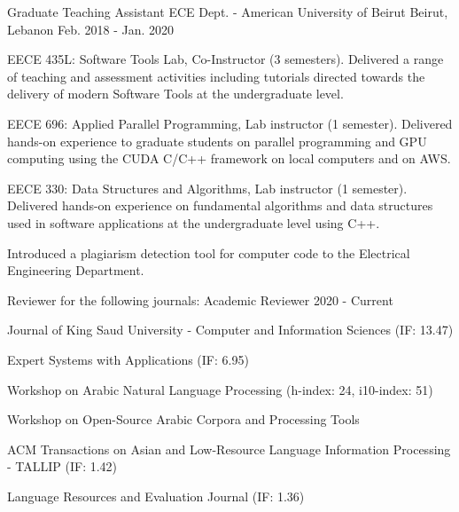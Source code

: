 \begin{cventries}
  \cventry
    {Graduate Teaching Assistant} %
    {ECE Dept. - American University of Beirut} %
    {Beirut, Lebanon} %
    {Feb. 2018 - Jan. 2020} %
    { 
      \begin{cvitems} %
        \item {EECE 435L: Software Tools Lab, Co-Instructor (3 semesters).  Delivered a range of teaching and assessment activities including tutorials directed towards the delivery of modern Software Tools at the undergraduate level.}
        \item {EECE 696: Applied Parallel Programming, Lab instructor (1 semester). Delivered hands-on experience to graduate students on parallel programming and GPU computing using the CUDA C/C++ framework on local computers and on AWS.}
        \item {EECE 330: Data Structures and Algorithms, Lab instructor (1 semester). Delivered hands-on experience on fundamental algorithms and data structures used in software applications at the undergraduate level using C++.}
        \item{Introduced a plagiarism detection tool for computer code to the Electrical Engineering Department.}
      \end{cvitems}
    }
  \cventry
    {Reviewer for the following journals:} %
    {Academic Reviewer} %
    {} %
    {2020 - Current} %
    { 
      \begin{cvitems} %
      \item {Journal of King Saud University - Computer and Information Sciences (IF: 13.47)}
        \item {Expert Systems with Applications (IF: 6.95)}
        \item Workshop on Arabic Natural Language Processing (h-index: 24, i10-index: 51)
        \item Workshop on Open-Source Arabic Corpora and Processing Tools
        \item {ACM Transactions on Asian and Low-Resource Language Information Processing - TALLIP (IF: 1.42)}
        \item {Language Resources and Evaluation Journal (IF: 1.36)}
      \end{cvitems}
    }
    \newline
    \newline

\end{cventries}
